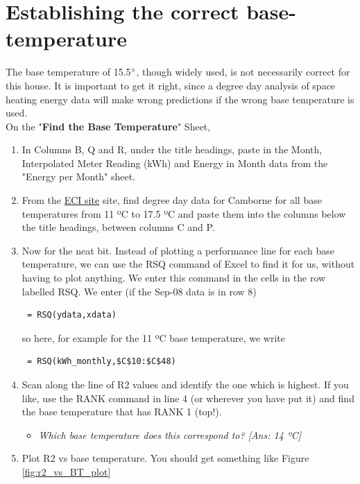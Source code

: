 \documentclass{article}
\begin{document}
\section{Establishing the correct base-temperature} 
The base temperature of 15.5$\degree$, though widely used, is not necessarily correct for this house. It is important to get it right, since a degree day analysis of space heating energy data will make wrong predictions if the wrong base temperature is used.\\

On the "\textbf{Find the Base Temperature}" Sheet, 
\begin{enumerate}
\item In Columns B, Q and R, under the title headings, paste in the Month, Interpolated Meter Reading (kWh) and Energy in Month data from the "Energy per Month" sheet.
\item From the \href{http://www.eci.ox.ac.uk/research/energy/degreedays.php}{ECI site} site, find degree day data for Camborne for all base temperatures from 11 ºC  to 17.5 ºC and paste them into the columns below the title headings, between columns C and P.
\item Now for the neat bit. Instead of plotting a performance line for each base temperature, we can use the {\color{blue}RSQ} command of Excel to find it for us, without having to plot anything. We enter this command in the cells in the row labelled {\color{blue}RSQ}. We enter (if the Sep-08 data is in row 8)
{\color{blue}
\begin{verbatim}
 = RSQ(ydata,xdata) 
 \end{verbatim}
 }
 so here, for example for the 11 ºC base temperature, we write
 {\color{blue}
 \begin{verbatim}
 = RSQ(kWh_monthly,$C$10:$C$48)
\end{verbatim}
}
\item Scan along the line of R2 values and identify the one which is highest. If you like, use the {\color{blue}RANK} command in line 4 (or wherever you have put it) and find the base temperature that has RANK 1 (top!).\\
\begin{itemize}
\item \textit{Which base temperature does this correspond to? [Ans: 14 ºC]}
\end{itemize}
\item Plot R2 vs base temperature. You should get something like Figure \ref{fig:r2_vs_BT_plot}


\end{enumerate}
\end{document}
